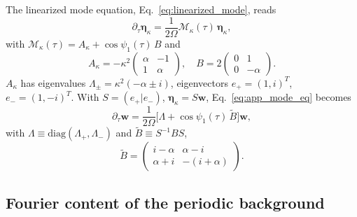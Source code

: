 

\section{}
\label{app:diagonalization}

The linearized mode equation, Eq.~\eqref{eq:linearized_mode}, reads
%
\begin{equation}
    \partial_\tau \boldsymbol{\eta}_\kappa = \frac{1}{2\Omega}\mathcal{M}_\kappa(\tau)\,\boldsymbol{\eta}_\kappa,
    \label{eq:app_mode_eq}
\end{equation}
%
with $\mathcal{M}_\kappa(\tau) = A_\kappa + \cos\psi_1(\tau)\,B$ and
%
\begin{equation}
    A_\kappa = -\kappa^2\begin{pmatrix}\alpha & -1\\ 1 & \alpha\end{pmatrix}, \quad
    B = 2\begin{pmatrix}0 & 1\\ 0 & -\alpha\end{pmatrix}.
    \label{eq:app_A_B}
\end{equation}
%
$A_\kappa$ has eigenvalues $\Lambda_\pm = \kappa^2(-\alpha\pm i)$, eigenvectors $e_+=(1,i)^T$, $e_-=(1,-i)^T$. With $S=(e_+|e_-)$, $\boldsymbol{\eta}_\kappa = S\mathbf{w}$, Eq.~\eqref{eq:app_mode_eq} becomes
%
\begin{equation}
    \partial_\tau \mathbf{w} = \frac{1}{2\Omega}\big[\Lambda + \cos\psi_1(\tau)\,\tilde B\big]\mathbf{w},
    \label{eq:app_w_frame}
\end{equation}
%
with $\Lambda \equiv \mathrm{diag}(\Lambda_+,\Lambda_-)$ and $\tilde B \equiv S^{-1}BS$,
%
\begin{equation}
    \tilde B = \begin{pmatrix} i-\alpha & \alpha-i\\ \alpha+i & -(i+\alpha)\end{pmatrix}.
    \label{eq:app_Btilde}
\end{equation}

\subsection{Fourier content of the periodic background}
\label{app:fourier}

